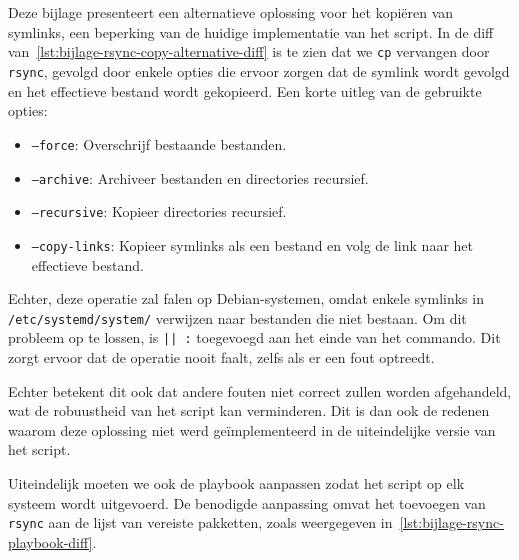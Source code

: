 
\chapter{}
\label{ch:bijlage_symlink_kopieren_met_rsync}

Deze bijlage presenteert een alternatieve oplossing voor het kopi\"eren van symlinks, een beperking van de huidige implementatie van het script.
In de diff van~\ref{lst:bijlage-rsync-copy-alternative-diff} is te zien dat we \texttt{cp} vervangen door \texttt{rsync}, gevolgd door enkele opties die ervoor zorgen dat de symlink wordt gevolgd en het effectieve bestand wordt gekopieerd.
Een korte uitleg van de gebruikte opties:

\begin{itemize}
  \item \texttt{--force}: Overschrijf bestaande bestanden.
  \item \texttt{--archive}: Archiveer bestanden en directories recursief.
  \item \texttt{--recursive}: Kopieer directories recursief.
  \item \texttt{--copy-links}: Kopieer symlinks als een bestand en volg de link naar het effectieve bestand.
\end{itemize}

Echter, deze operatie zal falen op Debian-systemen, omdat enkele symlinks in\\ \texttt{/etc/systemd/system/} verwijzen naar bestanden die niet bestaan.
Om dit probleem op te lossen, is \texttt{|| :} toegevoegd aan het einde van het commando.
Dit zorgt ervoor dat de operatie nooit faalt, zelfs als er een fout optreedt.

Echter betekent dit ook dat andere fouten niet correct zullen worden afgehandeld, wat de robuustheid van het script kan verminderen.
Dit is dan ook de redenen waarom deze oplossing niet werd ge\"implementeerd in de uiteindelijke versie van het script.

Uiteindelijk moeten we ook de playbook aanpassen zodat het script op elk systeem wordt uitgevoerd.
De benodigde aanpassing omvat het toevoegen van \texttt{rsync} aan de lijst van vereiste pakketten, zoals weergegeven in~\ref{lst:bijlage-rsync-playbook-diff}.

